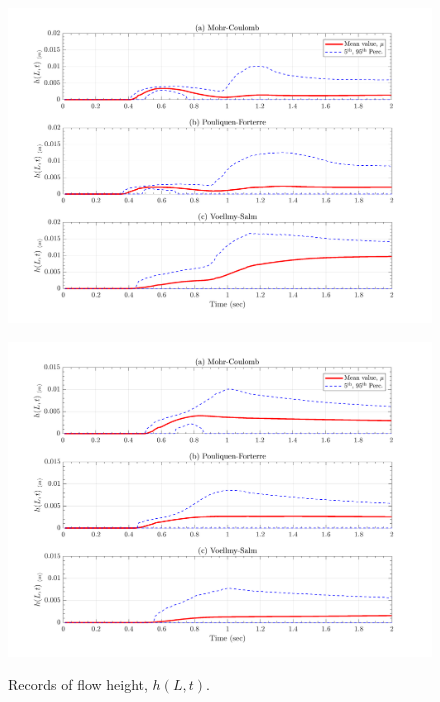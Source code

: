 \documentclass{article}
\begin{document}
\begin{figure}[H]
	\begin{minipage}[b]{0.5\linewidth}
    	\centering
    	\includegraphics[width=1\textwidth]{InclinedPlane/Height/H_L3.png}
    	\label{fig:Ramp-L3-H}
	\end{minipage}
	\begin{minipage}[b]{0.5\linewidth}
		\centering
		\includegraphics[width=1\textwidth]{InclinedPlane/Height/H_L4.png}
    	\label{fig:Ramp-L4-H}
    \end{minipage}
    \caption{Records of flow height, $h(L,t)$.}
    \label{fig:Ramp-LM-H}
\end{figure}
\end{document}
